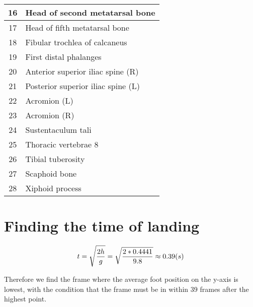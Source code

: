 \begin{table}[]
\begin{tabular}{|c|l|}
16                   & Head of second metatarsal bone           \\ \hline
17                   & Head of fifth metatarsal bone            \\ \hline
18                   & Fibular trochlea of calcaneus            \\ \hline
19                   & First distal phalanges                   \\ \hline
20                   & Anterior superior iliac spine (R)        \\ \hline
21                   & Posterior superior iliac spine (L)       \\ \hline
22                   & Acromion (L)                             \\ \hline
23                   & Acromion (R)                             \\ \hline
24                   & Sustentaculum tali                       \\ \hline
25                   & Thoracic vertebrae 8                     \\ \hline
26                   & Tibial tuberosity                        \\ \hline
27                   & Scaphoid bone                            \\ \hline
28                   & Xiphoid process                          \\ \hline
\end{tabular}
\end{table}

\section{Finding the time of landing}

\[  t   =   \sqrt{\frac{2h}{g}} \\
        =   \sqrt{\frac{2*0.4441}{9.8}}\\
        \approx 0.39 (s)    \]
        
Therefore we find the frame where the average foot position on the y-axis is lowest, with the condition that the frame must be in within 39 frames after the highest point.